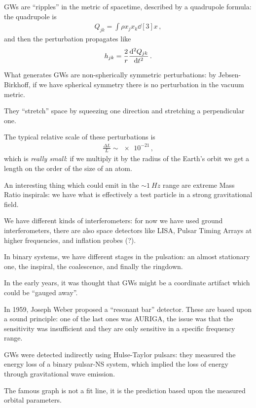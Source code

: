 \documentclass[main.tex]{subfiles}
\begin{document}
GWs are ``ripples'' in the metric of spacetime, described by a quadrupole formula: the quadrupole is 
%
\begin{align}
Q_{jk} = \int \rho x_{j} x_{k} \dd[3]{x}
\,,
\end{align}
%
and then the perturbation propagates like 
%
\begin{align}
h_{jk} = \frac{2}{r} \dv[2]{Q_{jk}}{t}
\,.
\end{align}

What generates GWs are non-spherically symmetric perturbations: by Jebsen-Birkhoff, if we have spherical symmetry there is no perturbation in the vacuum metric.

They ``stretch'' space by squeezing one direction and stretching a perpendicular one.

The typical relative scale of these perturbations is 
%
\begin{align}
\frac{\Delta L}{L} \sim \num{e-21}
\,,
\end{align}
%
which is \emph{really small}: if we multiply it by the radius of the Earth's orbit we get a length on the order of the size of an atom.

An interesting thing which could emit in the \(\sim \SI{1}{Hz}\) range are extreme Mass Ratio inspirals: we have what is effectively a test particle in a strong gravitational field.

We have different kinds of interferometers: for now we have used ground interferometers, there are also space detectors like LISA, Pulsar Timing Arrays at higher frequencies, and inflation probes (?).

In binary systems, we have different stages in the pulsation: an almost stationary one, the inspiral, the coalescence, and finally the ringdown.

In the early years, it was thought that GWs might be a coordinate artifact which could be ``gauged away''.

In 1959, Joseph Weber proposed a ``resonant bar'' detector. These are based upon a sound principle: one of the last ones was AURIGA, the issue was that the sensitivity was insufficient and they are only sensitive in a specific frequency range.

GWs were detected indirectly using Hulse-Taylor pulsars: they measured the energy loss of a binary pulsar-NS system, which implied the loss of energy through gravitational wave emission.

The famous graph is not a fit line, it is the prediction based upon the measured orbital parameters.
\end{document}
